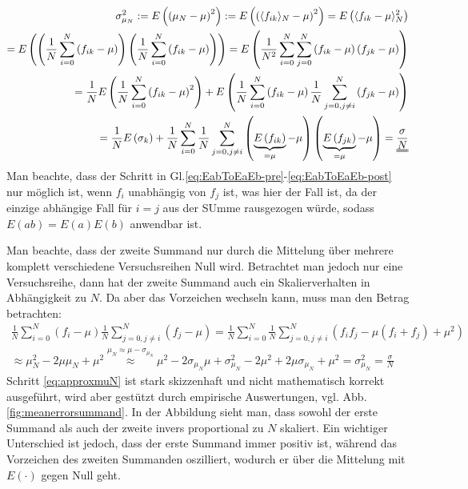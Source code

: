 \begin{align}
	\sigma_{\mu_N}^2
   := E\left( \left( \mu_N - \mu \right)^2 \right)
   := E\left( \left( \langle f_{ik} \rangle_N - \mu \right)^2 \right)
	= E\left( \langle f_{ik} - \mu \rangle_N^2 \right)
\\  = E\left(
	  \left( \frac{1}{N} \sum\limits_{i=0}^N \left(f_{ik}-\mu\right) \right)
	  \left( \frac{1}{N} \sum\limits_{i=0}^N \left(f_{ik}-\mu\right) \right)
	  \right)
	= E\left( \frac{1}{N^2} \sum\limits_{i=0}^N \sum\limits_{j=0}^N
		      \left( f_{ik}-\mu \right) \left( f_{jk}-\mu \right) \right)
    \\
	\label{eq:EabToEaEb-pre}
	= \frac{1}{N} E\left(
		 \frac{1}{N} \sum\limits_{i=0}^N \left( f_{ik}-\mu \right)^2
      \right)
    + E\left( \frac{1}{N} \sum\limits_{i=0}^N \left( f_{ik}-\mu \right)
      \frac{1}{N} \sum\limits_{j=0,j\neq i}^N \left( f_{jk}-\mu \right) \right)
    \\
	\label{eq:EabToEaEb-post}
    = \frac{1}{N} E\left( \sigma_k \right)
    + \frac{1}{N} \sum\limits_{i=0}^N
      \frac{1}{N} \sum\limits_{j=0,j\neq i}^N
      \left( \underbrace{E\left(f_{ik}\right)}_{=\mu}-\mu \right)
      \left( \underbrace{E\left(f_{jk}\right)}_{=\mu}-\mu \right)
	= \uuline{ \frac{\sigma}{N} }
\end{align}
Man beachte, dass der Schritt in Gl.\ref{eq:EabToEaEb-pre}-\ref{eq:EabToEaEb-post} nur möglich ist, wenn $f_i$ unabhängig von $f_j$ ist, was hier der Fall ist, da der einzige abhängige Fall für $i=j$ aus der SUmme rausgezogen würde, sodass $E(a b)=E(a)E(b)$ anwendbar ist.

Man beachte, dass der zweite Summand nur durch die Mittelung über mehrere komplett verschiedene Versuchsreihen Null wird. Betrachtet man jedoch nur eine Versuchsreihe, dann hat der zweite Summand auch ein Skalierverhalten in Abhängigkeit zu $N$. Da aber das Vorzeichen wechseln kann, muss man den Betrag betrachten:
\begin{align}
	\frac{1}{N} \sum\limits_{i=0}^N \left( f_i-\mu \right)
    \frac{1}{N} \sum\limits_{j=0,j\neq i}^N \left( f_j-\mu \right)
    =
	\frac{1}{N} \sum\limits_{i=0}^N
    \frac{1}{N} \sum\limits_{j=0,j\neq i}^N
    \left( f_i f_j - \mu \left( f_i + f_j \right) + \mu^2 \right)
    \\
    \label{eq:approxmuN}
    \approx
	\mu_N^2 - 2 \mu \mu_N + \mu^2
	\overset{ \mu_N \approx \mu - \sigma_{\mu_N} }{\approx}
	\mu^2 - 2 \sigma_{\mu_N} \mu + \sigma_{\mu_N}^2
	- 2\mu^2 + 2\mu \sigma_{\mu_N} + \mu^2
	= \sigma_{\mu_N}^2 = \frac{\sigma}{N}
\end{align}
Schritt \ref{eq:approxmuN} ist stark skizzenhaft und nicht mathematisch korrekt ausgeführt, wird aber gestützt durch empirische Auswertungen, vgl. Abb.\ref{fig:meanerrorsummand}. In der Abbildung sieht man, dass sowohl der erste Summand als auch der zweite invers proportional zu $N$ skaliert. Ein wichtiger Unterschied ist jedoch, dass der erste Summand immer positiv ist, während das Vorzeichen des zweiten Summanden oszilliert, wodurch er über die Mittelung mit $E(\cdot)$ gegen Null geht.

